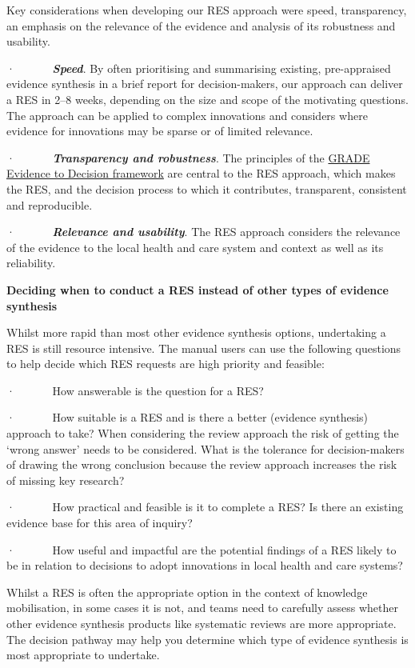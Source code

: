 \documentclass[
  letterpaper,
  DIV=11,
  numbers=noendperiod]{scrreprt}
\begin{document}
Key considerations when developing our RES approach were speed,
transparency, an emphasis on the relevance of the evidence and analysis
of its robustness and usability.

·~~~~~~ \textbf{\emph{Speed}}. By often prioritising and summarising
existing, pre-appraised evidence synthesis in a brief report for
decision-makers, our approach can deliver a RES in 2--8 weeks, depending
on the size and scope of the motivating questions. The approach can be
applied to complex innovations and considers where evidence for
innovations may be sparse or of limited relevance.

·~~~~~~ \textbf{\emph{Transparency and robustness}}. The principles of
the \href{https://www.bmj.com/content/353/bmj.i2016}{GRADE Evidence to
Decision framework} are central to the RES approach, which makes the
RES, and the decision process to which it contributes, transparent,
consistent and reproducible.

·~~~~~~ \textbf{\emph{Relevance and usability}}. The RES approach
considers the relevance of the evidence to the local health and care
system and context as well as its reliability.

\textbf{Deciding when to conduct a RES instead of other types of
evidence synthesis}

Whilst more rapid than most other evidence synthesis options,
undertaking a RES is still resource intensive. The manual users can use
the following questions to help decide which RES requests are high
priority and feasible:

·~~~~~~ How answerable is the question for a RES? ~

·~~~~~~ How suitable is a RES and is there a better (evidence synthesis)
approach to take? When considering the review approach the risk of
getting the `wrong answer' needs to be considered. What is the tolerance
for decision-makers of drawing the wrong conclusion because the review
approach increases the risk of missing key research?

·~~~~~~ How practical and feasible is it to complete a RES? Is there an
existing evidence base for this area of inquiry?

·~~~~~~ How useful and impactful are the potential findings of a RES
likely to be in relation to decisions to adopt innovations in local
health and care systems?

Whilst a RES is often the appropriate option in the context of knowledge
mobilisation, in some cases it is not, and teams need to carefully
assess whether other evidence synthesis products like systematic reviews
are more appropriate. The decision pathway may help you determine which
type of evidence synthesis is most appropriate to undertake.
\end{document}

